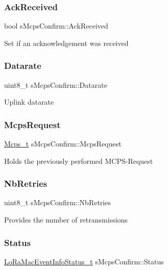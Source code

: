 \subsubsection{\texorpdfstring{Ack\+Received}{AckReceived}}
{\footnotesize\ttfamily bool s\+Mcps\+Confirm\+::\+Ack\+Received}

Set if an acknowledgement was received \mbox{\label{structsMcpsConfirm_a673d186fe97ac6903d84ea06d1af76e4}} 
\subsubsection{\texorpdfstring{Datarate}{Datarate}}
{\footnotesize\ttfamily uint8\+\_\+t s\+Mcps\+Confirm\+::\+Datarate}

Uplink datarate \mbox{\label{structsMcpsConfirm_af7f36d1afe5416d9395ffcce12f62145}} 
\subsubsection{\texorpdfstring{Mcps\+Request}{McpsRequest}}
{\footnotesize\ttfamily \hyperlink{group__LORAMAC_ga670d0c87a52aeb13391f303a4cf94f00}{Mcps\+\_\+t} s\+Mcps\+Confirm\+::\+Mcps\+Request}

Holds the previously performed M\+C\+P\+S-\/\+Request \mbox{\label{structsMcpsConfirm_a6939fdebdf1c09cde31514f87c72a0ce}} 
\subsubsection{\texorpdfstring{Nb\+Retries}{NbRetries}}
{\footnotesize\ttfamily uint8\+\_\+t s\+Mcps\+Confirm\+::\+Nb\+Retries}

Provides the number of retransmissions \mbox{\label{structsMcpsConfirm_a4e10bb1a3159c6c0fafb1d59dee1fc2a}} 
\subsubsection{\texorpdfstring{Status}{Status}}
{\footnotesize\ttfamily \hyperlink{group__LORAMAC_gac6ffc346a4c767f7a743c87a686c51b4}{Lo\+Ra\+Mac\+Event\+Info\+Status\+\_\+t} s\+Mcps\+Confirm\+::\+Status}

